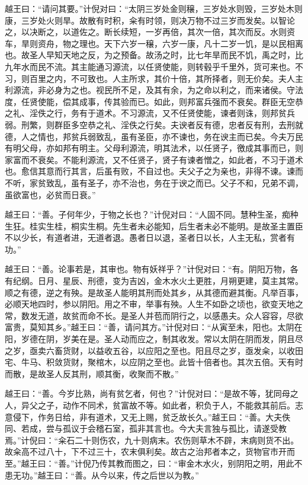 \documentclass[12pt,UTF8]{ctexbook}
\begin{document}
越王曰：“请问其要。”计倪对曰：“太阴三岁处金则穣，三岁处水则毁，三岁处木则康，三岁处火则旱。故散有时积，籴有时领，则决万物不过三岁而发矣。以智论之，以决断之，以道佐之。断长续短，一岁再倍，其次一倍，其次而反。水则资车，旱则资舟，物之理也。天下六岁一穣，六岁一康，凡十二岁一饥，是以民相离也。故圣人早知天地之反，为之预备。故汤之时，比七年旱而民不饥，禹之时，比九年水而民不流。其主能通习源流，以任贤使能，则转毂乎千里外，货可来也。不习，则百里之内，不可致也。人主所求，其价十倍，其所择者，则无价矣。夫人主利源流，非必身为之也。视民所不足，及其有余，为之命以利之，而来诸侯。守法度，任贤使能，偿其成事，传其验而已。如此，则邦富兵强而不衰矣。群臣无空恭之礼、淫佚之行，务有于道术。不习源流，又不任贤使能，谏者则诛，则邦贫兵弱。刑繁，则群臣多空恭之礼、淫佚之行矣。夫谀者反有德，忠者反有刑，去刑就德，人之情也，邦贫兵弱致乱，虽有圣臣，亦不谏也，务在谀主而已矣。今夫万民有明父母，亦如邦有明主。父母利源流，明其法术，以任贤子，徼成其事而已，则家富而不衰矣。不能利源流，又不任贤子，贤子有谏者憎之，如此者，不习于道术也。愈信其意而行其言，后虽有败，不自过也。夫父子之为亲也，非得不谏。谏而不听，家贫致乱，虽有圣子，亦不治也，务在于谀之而已。父子不和，兄弟不调，虽欲富也，必贫而日衰。”

越王曰：“善。子何年少，于物之长也？”计倪对曰：“人固不同。慧种生圣，痴种生狂。桂实生桂，桐实生桐。先生者未必能知，后生者未必不能明。是故圣主置臣不以少长，有道者进，无道者退。愚者日以退，圣者日以长，人主无私，赏者有功。”

越王曰：“善。论事若是，其审也。物有妖祥乎？”计倪对曰：“有。阴阳万物，各有纪纲。日月、星辰、刑德，变为吉凶，金木水火土更胜，月朔更建，莫主其常。顺之有德，逆之有殃。是故圣人能明其刑而处其乡，从其德而避其衡。凡举百事，必顺天地四时，参以阴阳。用之不审，举事有殃。人生不如卧之顷也，欲变天地之常，数发无道，故贫而命不长。是圣人并苞而阴行之，以感愚夫。众人容容，尽欲富贵，莫知其乡。”越王曰：“善，请问其方。”计倪对曰：“从寅至未，阳也。太阴在阳，岁德在阴，岁美在是。圣人动而应之，制其收发。常以太阴在阴而发，阴且尽之岁，亟卖六畜货财，以益收五谷，以应阳之至也。阳且尽之岁，亟发籴，以收田宅、牛马、积敛货财，聚棺木，以应阴之至也。此皆十倍者也。其次五倍。天有时而散，是故圣人反其刑，顺其衡，收聚而不散。”

越王曰：“善。今岁比熟，尚有贫乞者，何也？”计倪对曰：“是故不等，犹同母之人，异父之子，动作不同术，贫富故不等。如此者，积负于人，不能救其前后。志意侵下，作务日给，非有道术，又无上赐，贫乏故长久。”越王曰：“善。大夫佚同、若成，尝与孤议于会稽石室，孤非其言也。今大夫言独与孤比，请遂受教焉。”计倪曰：“籴石二十则伤农，九十则病末。农伤则草木不辟，末病则货不出。故籴高不过八十，下不过三十，农末俱利矣。故古之治邦者本之，货物官市开而至。”越王曰：“善。”计倪乃传其教而图之，曰：“审金木水火，别阴阳之明，用此不患无功。”越王曰：“善。从今以来，传之后世以为教。”
\end{document}
